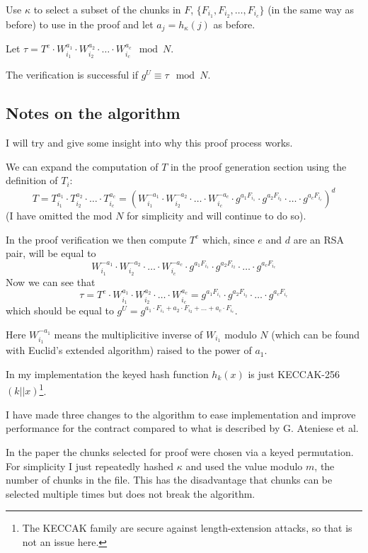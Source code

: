 \documentclass[12pt,a4paper,twoside,openright]{report}
\begin{document}
Use $\kappa$ to select a subset of the chunks in $F$, $\{F_{i_1}, F_{i_2}, \ldots, F_{i_c}\}$ (in the same way as before) to use in the proof
and let $a_j = h_\kappa(j)$ as before.

Let $\tau = T^e \cdot W_{i_1}^{a_1} \cdot W_{i_2}^{a_2} \cdot \ldots \cdot W_{i_c}^{a_c} \mod N$.

The verification is successful if $g^U \equiv \tau \mod N$.

\subsection{Notes on the algorithm}

I will try and give some insight into why this proof process works.

We can expand the computation of $T$ in the proof generation section using the definition of $T_i$:
\[T = T^{a_1}_{i_1} \cdot T^{a_2}_{i_2} \cdot \ldots \cdot T^{a_c}_{i_c} =
\left(W_{i_1}^{-a_1} \cdot W_{i_2}^{-a_2} \cdot \ldots \cdot W_{i_c}^{-a_c} \cdot g^{a_1 F_{i_1}} \cdot g^{a_2 F_{i_2}} \cdot \ldots \cdot g^{a_c F_{i_c}}\right)^d\]
(I have omitted the mod $N$ for simplicity and will continue to do so).

In the proof verification we then compute $T^e$ which, since $e$ and $d$ are an RSA pair, will be equal to
\[W_{i_1}^{-a_1} \cdot W_{i_2}^{-a_2} \cdot \ldots \cdot W_{i_c}^{-a_c} \cdot g^{a_1 F_{i_1}} \cdot g^{a_2 F_{i_2}} \cdot \ldots \cdot g^{a_c F_{i_c}}\]
Now we can see that
\[\tau = T^e \cdot W_{i_1}^{a_1} \cdot W_{i_2}^{a_2} \cdot \ldots \cdot W_{i_c}^{a_c} = g^{a_1 F_{i_1}} \cdot g^{a_2 F_{i_2}} \cdot \ldots \cdot g^{a_c F_{i_c}}\]
which should be equal to $g^U = g^{a_1 \cdot F_{i_1} + a_2 \cdot F_{i_2} + \ldots + a_c \cdot F_{i_c}}$.

Here $W_{i_1}^{-a_1}$ means the multiplicitive inverse of $W_{i_1}$ modulo $N$ (which can be found with Euclid's extended algorithm)
raised to the power of $a_1$.

In my implementation the keyed hash function $h_k(x)$ is just KECCAK-256$(k || x)$\footnote{The KECCAK family are secure against length-extension attacks, so that is not an issue here.}.


I have made three changes to the algorithm to ease implementation and improve performance for the contract compared to what is described by G. Ateniese et al.

In the paper the chunks selected for proof were chosen via a keyed permutation.
For simplicity I just repeatedly hashed $\kappa$ and used the value modulo $m$, the number of chunks in the file.
This has the disadvantage that chunks can be selected multiple times but does not break the algorithm.
\end{document}
